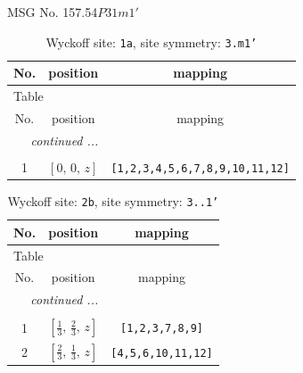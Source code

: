 \documentclass[fleqn,8pt]{jsarticle}
\begin{document}
\setcounter{MaxMatrixCols}{32}

\renewcommand{\tablename}{Table~}
\renewcommand{\figurename}{Figure~}
\begin{center}
\LARGE
MSG No. 157.54\quad$P31m1'$
\end{center}
\renewcommand{\arraystretch}{1.2}
\begin{longtable}{ccc}
\caption{Wyckoff site: {\tt 1a}, site symmetry: {\tt 3.m1'}}
 \\
 \hline \hline
No. & position & mapping \\ \hline \endfirsthead

\multicolumn{2}{l}{\tablename\ \thetable{}} \\
 \hline \hline
No. & position & mapping \\ \hline \endhead

 \hline \hline
\multicolumn{2}{r}{\footnotesize\it continued ...} \\ \endfoot

 \hline \hline
\multicolumn{2}{r}{} \\ \endlastfoot

1 & $\left[ 0,\, 0,\, z \right]$ & {\tt [1,2,3,4,5,6,7,8,9,10,11,12]} \\
\end{longtable}
\renewcommand{\arraystretch}{1.2}
\begin{longtable}{ccc}
\caption{Wyckoff site: {\tt 2b}, site symmetry: {\tt 3..1'}}
 \\
 \hline \hline
No. & position & mapping \\ \hline \endfirsthead

\multicolumn{2}{l}{\tablename\ \thetable{}} \\
 \hline \hline
No. & position & mapping \\ \hline \endhead

 \hline \hline
\multicolumn{2}{r}{\footnotesize\it continued ...} \\ \endfoot

 \hline \hline
\multicolumn{2}{r}{} \\ \endlastfoot

1 & $\left[ \frac{1}{3},\, \frac{2}{3},\, z \right]$ & {\tt [1,2,3,7,8,9]} \\ \hline
2 & $\left[ \frac{2}{3},\, \frac{1}{3},\, z \right]$ & {\tt [4,5,6,10,11,12]} \\
\end{longtable}
\renewcommand{\arraystretch}{1.2}
\end{document}
